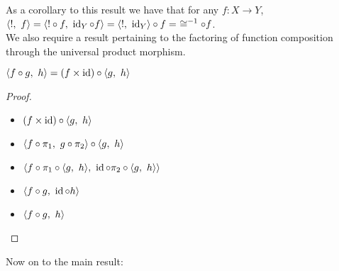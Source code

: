 As a corollary to this result we have that for any $f : X\to Y$, $\langle !,~f\rangle = \langle !\circ f,~\operatorname{id}_Y\circ f\rangle = \langle !,~\operatorname{id}_Y\rangle\circ f =~\cong^{-1}\circ f$.\\[1em]

We also require a result pertaining to the factoring of function composition through the universal product morphism.

\begin{lemma}\label{lemma:prod-comp-factor}
  $\langle f\circ g,~h\rangle = (f\times\operatorname{id})\circ\langle g,~h\rangle$
  \begin{proof}
    \begin{itemize}
      \item[\phs]
        $(f\times\operatorname{id})\circ\langle g,~h\rangle$

      \item[\eqs]
        $\langle f\circ\pi_1,~g\circ\pi_2\rangle\circ\langle g,~h\rangle$
        \marginnote{\Def-$\times$}

      \item[\eqs]
        $\langle f\circ\pi_1\circ\langle g,~h\rangle,~\operatorname{id}\circ\pi_2\circ\langle g,~h\rangle\rangle$

      \item[\eqs]
        $\langle f\circ g,~\operatorname{id}\circ h\rangle$

      \item[\eqs]
        $\langle f\circ g,~h\rangle$
        \qedhere
        \marginnote{\Def-$\id$}
    \end{itemize}
  \end{proof}
\end{lemma}

Now on to the main result:

